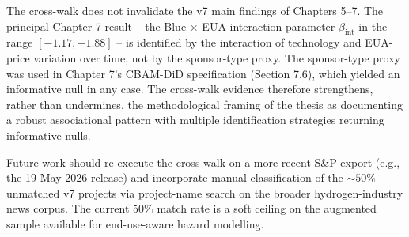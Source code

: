 \documentclass[11pt,a4paper]{article}
\newcommand{\bint}{\beta_{\mathrm{int}}}
\begin{document}
The cross-walk does not invalidate the v7 main findings of Chapters 5--7. The principal Chapter 7 result -- the Blue $\times$ EUA interaction parameter $\bint$ in the range $[-1.17, -1.88]$ -- is identified by the interaction of technology and EUA-price variation over time, not by the sponsor-type proxy. The sponsor-type proxy was used in Chapter 7's CBAM-DiD specification (Section 7.6), which yielded an informative null in any case. The cross-walk evidence therefore strengthens, rather than undermines, the methodological framing of the thesis as documenting a robust associational pattern with multiple identification strategies returning informative nulls.

Future work should re-execute the cross-walk on a more recent S\&P export (e.g., the 19 May 2026 release) and incorporate manual classification of the $\sim 50\%$ unmatched v7 projects via project-name search on the broader hydrogen-industry news corpus. The current $50\%$ match rate is a soft ceiling on the augmented sample available for end-use-aware hazard modelling.
\end{document}
